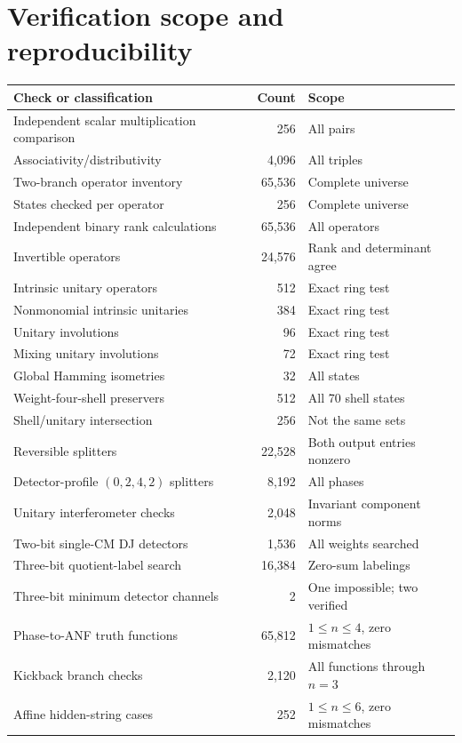 \section{Verification scope and reproducibility}\label{app:audit}
\begin{longtable}{@{}L{0.48\textwidth}rL{0.31\textwidth}@{}}
\toprule Check or classification & Count & Scope\\\midrule\endhead
Independent scalar multiplication comparison & 256 & All pairs\\
Associativity/distributivity & 4,096 & All triples\\
Two-branch operator inventory & 65,536 & Complete universe\\
States checked per operator & 256 & Complete universe\\
Independent binary rank calculations & 65,536 & All operators\\
Invertible operators & 24,576 & Rank and determinant agree\\
Intrinsic unitary operators & 512 & Exact ring test\\
Nonmonomial intrinsic unitaries & 384 & Exact ring test\\
Unitary involutions & 96 & Exact ring test\\
Mixing unitary involutions & 72 & Exact ring test\\
Global Hamming isometries & 32 & All states\\
Weight-four-shell preservers & 512 & All 70 shell states\\
Shell/unitary intersection & 256 & Not the same sets\\
Reversible splitters & 22,528 & Both output entries nonzero\\
Detector-profile $(0,2,4,2)$ splitters & 8,192 & All phases\\
Unitary interferometer checks & 2,048 & Invariant component norms\\
Two-bit single-CM DJ detectors & 1,536 & All weights searched\\
Three-bit quotient-label search & 16,384 & Zero-sum labelings\\
Three-bit minimum detector channels & 2 & One impossible; two verified\\
Phase-to-ANF truth functions & 65,812 & $1\le n\le4$, zero mismatches\\
Kickback branch checks & 2,120 & All functions through $n=3$\\
Affine hidden-string cases & 252 & $1\le n\le6$, zero mismatches\\

\end{longtable}
